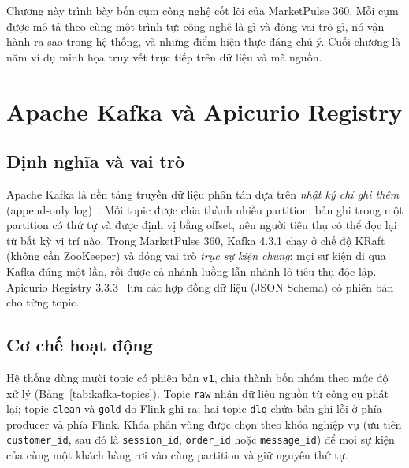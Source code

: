 
Chương này trình bày bốn cụm công nghệ cốt lõi của MarketPulse 360. Mỗi cụm được mô tả theo cùng một trình tự: công nghệ là gì và đóng vai trò gì, nó vận hành ra sao trong hệ thống, và những điểm hiện thực đáng chú ý. Cuối chương là năm ví dụ minh họa truy vết trực tiếp trên dữ liệu và mã nguồn.

\section{Apache Kafka và Apicurio Registry}
\label{sec:c3-kafka}

\subsection{Định nghĩa và vai trò}
\label{sec:c3-kafka-dinh-nghia}
Apache Kafka là nền tảng truyền dữ liệu phân tán dựa trên \emph{nhật ký chỉ ghi thêm} (append-only log)~\cite{kreps2011kafka, kafkadocs}. Mỗi topic được chia thành nhiều partition; bản ghi trong một partition có thứ tự và được định vị bằng offset, nên người tiêu thụ có thể đọc lại từ bất kỳ vị trí nào. Trong MarketPulse 360, Kafka 4.3.1 chạy ở chế độ KRaft (không cần ZooKeeper) và đóng vai trò \emph{trục sự kiện chung}: mọi sự kiện đi qua Kafka đúng một lần, rồi được cả nhánh luồng lẫn nhánh lô tiêu thụ độc lập. Apicurio Registry 3.3.3~\cite{apicurio} lưu các hợp đồng dữ liệu (JSON Schema) có phiên bản cho từng topic.

\subsection{Cơ chế hoạt động}
\label{sec:c3-kafka-co-che}
Hệ thống dùng mười topic có phiên bản \texttt{v1}, chia thành bốn nhóm theo mức độ xử lý (Bảng~\ref{tab:kafka-topics}). Topic \texttt{raw} nhận dữ liệu nguồn từ công cụ phát lại; topic \texttt{clean} và \texttt{gold} do Flink ghi ra; hai topic \texttt{dlq} chứa bản ghi lỗi ở phía producer và phía Flink. Khóa phân vùng được chọn theo khóa nghiệp vụ (ưu tiên \texttt{customer\_id}, sau đó là \texttt{session\_id}, \texttt{order\_id} hoặc \texttt{message\_id}) để mọi sự kiện của cùng một khách hàng rơi vào cùng partition và giữ nguyên thứ tự.

